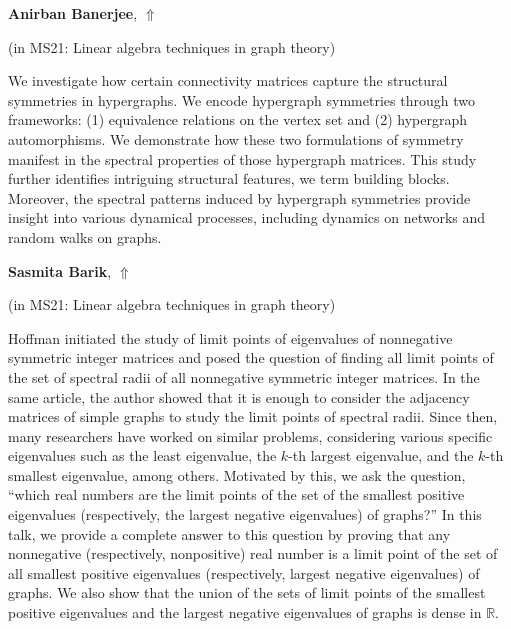 \documentclass[ILAS2025-program.tex]{subfiles}
\begin{document}
\hypertarget{down0382}{}\begin{ilasabstract}
    
\textbf{Anirban Banerjee},  \hfill \hyperlink{up0382}{$\Uparrow$}
    
    
(in {\color{mstitle}MS21: Linear algebra techniques in graph theory})
        
\mtskip
    We investigate how certain connectivity matrices capture the structural symmetries in hypergraphs. We encode hypergraph symmetries through two frameworks: (1) equivalence relations on the vertex set and (2) hypergraph automorphisms. We demonstrate how these two formulations of symmetry manifest in the spectral properties of those hypergraph matrices. This study further identifies intriguing structural features, we term building blocks. Moreover, the spectral patterns induced by hypergraph symmetries provide insight into various dynamical processes, including dynamics on networks and random walks on graphs.

\end{ilasabstract}
    

\hypertarget{down0336}{}\begin{ilasabstract}
    
\textbf{Sasmita Barik},  \hfill \hyperlink{up0336}{$\Uparrow$}
    
    
(in {\color{mstitle}MS21: Linear algebra techniques in graph theory})
        
\mtskip
    Hoffman initiated the study of limit points of eigenvalues of nonnegative symmetric integer matrices and posed the question of finding all limit points of the set of spectral radii of all nonnegative symmetric integer matrices. In the same article, the author showed that it is enough to consider the adjacency matrices of simple graphs to study the limit points of spectral radii. Since then, many researchers have worked on similar problems, considering various specific eigenvalues such as the least eigenvalue, the $k$-th largest eigenvalue, and the $k$-th smallest eigenvalue, among others. Motivated by this, we ask the question, ``which real numbers are the limit points of the set of the smallest positive eigenvalues (respectively, the largest negative eigenvalues) of graphs?'' In this talk, we provide a complete answer to this question by proving that any nonnegative (respectively, nonpositive) real number is a limit point of the set of all smallest positive eigenvalues (respectively, largest negative eigenvalues) of graphs. We also show that the union of the sets of limit points of the smallest positive eigenvalues and the largest negative eigenvalues of graphs is dense in $\mathbb{R}$.

\end{ilasabstract}
    
\end{document}
